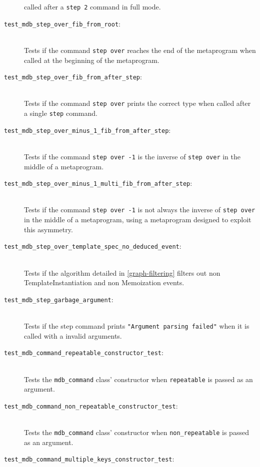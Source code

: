 \begin{description}
        called after a \texttt{step 2} command in full mode.
    \item[\texttt{test\_mdb\_step\_over\_fib\_from\_root}:] \hfill \\
        Tests if the command \texttt{step over} reaches the end of the
        metaprogram when called at the beginning of the metaprogram.
    \item[\texttt{test\_mdb\_step\_over\_fib\_from\_after\_step}:] \hfill \\
        Tests if the command \texttt{step over} prints the correct type when
        called after a single \texttt{step} command.
    \item[\texttt{test\_mdb\_step\_over\_minus\_1\_fib\_from\_after\_step}:] \hfill \\
        Tests if the command \texttt{step over -1} is the inverse of
        \texttt{step over} in the middle of a metaprogram.
    \item[\texttt{test\_mdb\_step\_over\_minus\_1\_multi\_fib\_from\_after\_step}:] \hfill \\
        Tests if the command \texttt{step over -1} is not always the inverse
        of \texttt{step over} in the middle of a metaprogram, using a
        metaprogram designed to exploit this asymmetry.
    \item[\texttt{test\_mdb\_step\_over\_template\_spec\_no\_deduced\_event}:] \hfill \\
        Tests if the algorithm detailed in \ref{graph-filtering} filters out
        non TemplateInstantiation and non Memoization events.
    \item[\texttt{test\_mdb\_step\_garbage\_argument}:] \hfill \\
        Tests if the step command prints
        \texttt{"Argument parsing failed"} when it is called with a invalid
        arguments.
    \item[\texttt{test\_mdb\_command\_repeatable\_constructor\_test}:] \hfill \\
        Tests the \texttt{mdb\_command} class' constructor when
        \texttt{repeatable} is passed as an argument.
    \item[\texttt{test\_mdb\_command\_non\_repeatable\_constructor\_test}:] \hfill \\
        Tests the \texttt{mdb\_command} class' constructor when
        \texttt{non\_repeatable} is passed as an argument.
    \item[\texttt{test\_mdb\_command\_multiple\_keys\_constructor\_test}:] \hfill \\

\end{description}
